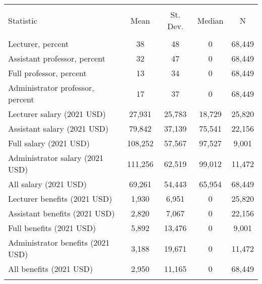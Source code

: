 
\begin{tabular}{@{\extracolsep{5pt}}lcccc} 
\\[-1.8ex]\hline 
\hline \\[-1.8ex] 
Statistic & \multicolumn{1}{c}{Mean} & \multicolumn{1}{c}{St. Dev.} & \multicolumn{1}{c}{Median} & \multicolumn{1}{c}{N} \\ 
\hline \\[-1.8ex] 
Lecturer, percent & 38 & 48 & 0 & 68,449 \\ 
Assistant professor, percent & 32 & 47 & 0 & 68,449 \\ 
Full professor, percent & 13 & 34 & 0 & 68,449 \\ 
Administrator professor, percent & 17 & 37 & 0 & 68,449 \\ 
Lecturer salary (2021 USD) & 27,931 & 25,783 & 18,729 & 25,820 \\ 
Assistant salary (2021 USD) & 79,842 & 37,139 & 75,541 & 22,156 \\ 
Full salary (2021 USD) & 108,252 & 57,567 & 97,527 & 9,001 \\ 
Administrator salary (2021 USD) & 111,256 & 62,519 & 99,012 & 11,472 \\ 
All salary (2021 USD) & 69,261 & 54,443 & 65,954 & 68,449 \\ 
Lecturer benefits (2021 USD) & 1,930 & 6,951 & 0 & 25,820 \\ 
Assistant benefits (2021 USD) & 2,820 & 7,067 & 0 & 22,156 \\ 
Full benefits (2021 USD) & 5,892 & 13,476 & 0 & 9,001 \\ 
Administrator benefits (2021 USD) & 3,188 & 19,671 & 0 & 11,472 \\ 
All benefits (2021 USD) & 2,950 & 11,165 & 0 & 68,449 \\ 
\hline \\[-1.8ex] 
\end{tabular} 
